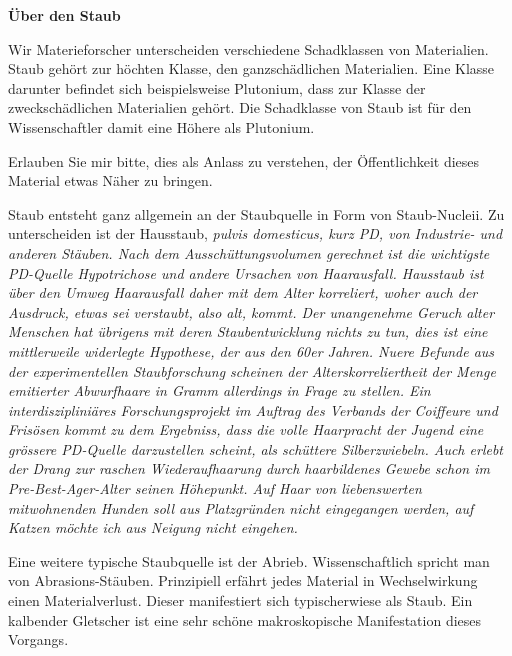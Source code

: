 \thispagestyle{empty}
\begin{center}
\end{center}
\vskip 2cm
{\Large\color{farbe}\hfill{\merriweathersans \textbf{Über den Staub}}}
\newpage
\lettrine[lines=2, lhang=.2, loversize=.25, lraise=0.05, findent=0.1em,
nindent=0em]{W}{}ir Materieforscher unterscheiden verschiedene Schadklassen von Materialien. Staub gehört zur höchten Klasse, den ganzschädlichen Materialien. Eine Klasse darunter befindet sich beispielsweise Plutonium, dass zur Klasse der zweckschädlichen Materialien gehört. Die Schadklasse von Staub ist für den Wissenschaftler damit eine Höhere als Plutonium.  

Erlauben Sie mir bitte, dies als Anlass zu verstehen, der Öffentlichkeit dieses Material etwas Näher zu bringen. 

Staub entsteht ganz allgemein an der Staubquelle in Form von  Staub-Nucleii. Zu unterscheiden ist der Hausstaub, \itshape{pulvis domesticus}, kurz PD, von Industrie- und anderen Stäuben. Nach dem Ausschüttungsvolumen gerechnet ist die wichtigste PD-Quelle Hypotrichose und andere Ursachen von Haarausfall. Hausstaub ist über den Umweg Haarausfall daher mit dem Alter korreliert, woher auch der Ausdruck, etwas sei verstaubt, also alt, kommt. Der unangenehme Geruch alter Menschen hat übrigens mit deren Staubentwicklung nichts zu tun, dies ist eine mittlerweile widerlegte Hypothese, der aus den 60er Jahren. Nuere Befunde aus der experimentellen Staubforschung scheinen der Alterskorreliertheit der Menge emitierter Abwurfhaare in Gramm allerdings in Frage zu stellen. Ein interdiszipliniäres Forschungsprojekt im Auftrag des Verbands der Coiffeure und Frisösen kommt zu dem Ergebniss, dass die volle Haarpracht der Jugend eine grössere PD-Quelle darzustellen scheint, als schüttere Silberzwiebeln. Auch erlebt der Drang zur raschen Wiederaufhaarung durch haarbildenes Gewebe schon im Pre-Best-Ager-Alter seinen Höhepunkt. Auf Haar von liebenswerten mitwohnenden Hunden soll aus Platzgründen nicht eingegangen werden, auf Katzen möchte ich aus Neigung nicht eingehen.

Eine weitere typische Staubquelle ist der Abrieb. Wissenschaftlich spricht man von Abrasions-Stäuben. Prinzipiell erfährt jedes Material in Wechselwirkung einen Materialverlust. Dieser manifestiert sich typischerwiese als Staub. Ein kalbender Gletscher ist eine sehr schöne makroskopische Manifestation dieses Vorgangs.

